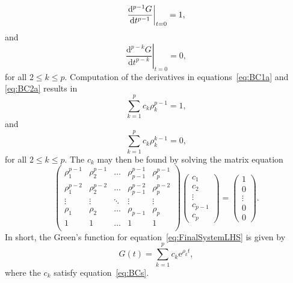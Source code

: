\documentclass[a4paper,fleqn,usenatbib]{mnras}
\begin{document}
\begin{equation}\label{eq:BC1a}
 \left.\frac{\mathrm{d}^{p-1}G}{\mathrm{d}t^{p-1}}\right|_{t = 0} = 1,\\
\end{equation}
and
\begin{equation}\label{eq:BC2a}
 \left.\frac{\mathrm{d}^{p-k}G}{\mathrm{d}t^{p-k}}\right|_{t = 0} = 0,
\end{equation}
for all $2 \leq k \leq p$. Computation of the derivatives in equations~\eqref{eq:BC1a} and \eqref{eq:BC2a} results in
\begin{equation}\label{eq:BC1b}
 \sum_{k = 1}^{p} c_{k} \rho_{k}^{p-1} = 1,
 \end{equation}
 and
\begin{equation}\label{eq:BC2b}
 \sum_{k = 1}^{p} c_{k} \rho_{k}^{k-1} = 0,
\end{equation}
for all $2 \leq k \leq p$. The $c_{k}$ may then be found by solving the matrix equation
\begin{equation}\label{eq:BCs}
\left( \begin{array}{ccccc}
\rho_{1}^{p-1} & \rho_{2}^{p-1} & \hdots & \rho_{p-1}^{p-1} & \rho_{p}^{p-1} \\
\rho_{1}^{p-2} & \rho_{2}^{p-2} & \hdots & \rho_{p-1}^{p-2} & \rho_{p}^{p-2} \\
\vdots & \vdots & \ddots & \vdots & \vdots \\
\rho_{1} & \rho_{2} & \hdots & \rho_{p-1} & \rho_{p} \\
1 & 1 & \hdots & 1 & 1 \\
\end{array}\right) \left( \begin{array}{c} c_{1} \\ c_{2} \\ \vdots \\ c_{p-1} \\ c_{p} \end{array} \right) = \left( \begin{array}{c} 1 \\ 0 \\ \vdots \\ 0 \\ 0 \end{array} \right).
\end{equation}
In short, the Green's function for equation~\eqref{eq:FinalSystemLHS} is given by
\begin{equation}\label{eq:GreenSol}
G(t) = \sum_{k = 1}^{p} c_{k} \mathrm{e}^{\rho_{k}t},
\end{equation}
where the $c_{k}$ satisfy equation~\eqref{eq:BCs}.
\end{document}
